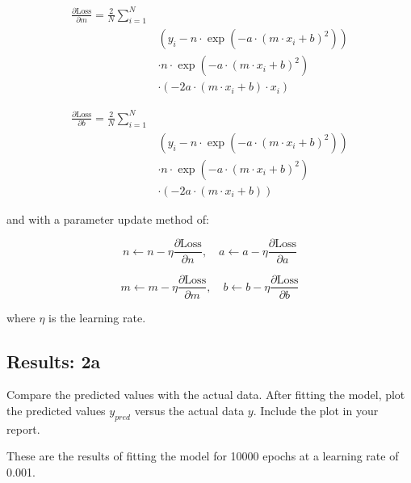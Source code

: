 \documentclass[letterpaper, 10 pt, conference]{ieeeconf}  %
\begin{document}
\begin{equation}
   \begin{aligned}
   \frac{\partial \text{Loss}}{\partial m} = \frac{2}{N} \sum_{i=1}^N \\
   & \left( y_i - n \cdot \exp\left(-a \cdot \left(m \cdot x_i + b\right)^2\right) \right) \\
   & \cdot n \cdot \exp\left(-a \cdot \left(m \cdot x_i + b\right)^2\right) \\
   & \cdot \left(-2a \cdot \left(m \cdot x_i + b\right) \cdot x_i\right)
   \end{aligned}
\end{equation}

\begin{equation}
   \begin{aligned}
   \frac{\partial \text{Loss}}{\partial b} = \frac{2}{N} \sum_{i=1}^N \\
   & \left( y_i - n \cdot \exp\left(-a \cdot \left(m \cdot x_i + b\right)^2\right) \right) \\
   & \cdot n \cdot \exp\left(-a \cdot \left(m \cdot x_i + b\right)^2\right) \\
   & \cdot \left(-2a \cdot \left(m \cdot x_i + b\right)\right)
   \end{aligned}
\end{equation}


and with a parameter update method of:

\begin{equation}
n \leftarrow n - \eta \frac{\partial \text{Loss}}{\partial n}, \quad a \leftarrow a - \eta \frac{\partial \text{Loss}}{\partial a}
\end{equation}

\begin{equation}
m \leftarrow m - \eta \frac{\partial \text{Loss}}{\partial m}, \quad b \leftarrow b - \eta \frac{\partial \text{Loss}}{\partial b}
\end{equation}

where $\eta$ is the learning rate.

\subsection{Results: 2a}
Compare the predicted values with the actual data. 
After fitting the model, plot the predicted values $y_{pred}$ versus the actual data $y$. 
Include the plot in your report.

These are the results of fitting the model for 10000 epochs at a learning rate of 0.001.
\end{document}
